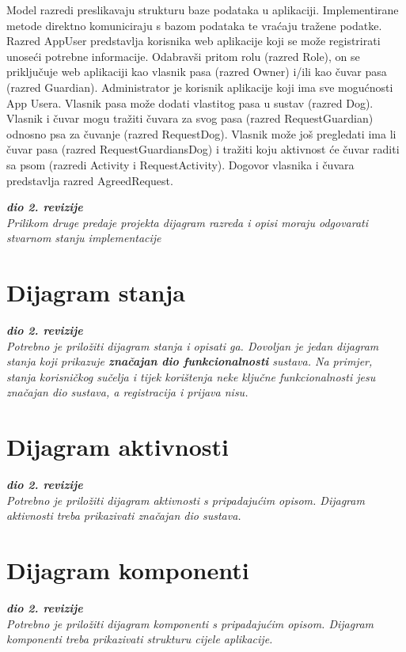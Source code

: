 			Model razredi preslikavaju strukturu baze podataka u aplikaciji. Implementirane metode direktno komuniciraju s bazom podataka te vraćaju tražene podatke.\\
			Razred AppUser predstavlja korisnika web aplikacije koji se može registrirati unoseći potrebne informacije. Odabravši pritom rolu (razred Role), on se priključuje web aplikaciji kao vlasnik pasa (razred Owner) i/ili kao čuvar pasa (razred Guardian). Administrator je korisnik aplikacije koji ima sve mogućnosti App Usera. Vlasnik pasa može dodati vlastitog pasa u sustav (razred Dog). Vlasnik i čuvar mogu tražiti čuvara za svog pasa (razred RequestGuardian) odnosno psa za čuvanje (razred RequestDog). Vlasnik može još pregledati ima li čuvar pasa (razred RequestGuardiansDog) i tražiti koju aktivnost će čuvar raditi sa psom (razredi Activity i RequestActivity). Dogovor vlasnika i čuvara predstavlja razred AgreedRequest.
			
			\eject
			
			\textbf{\textit{dio 2. revizije}}\\			
			
			\textit{Prilikom druge predaje projekta dijagram razreda i opisi moraju odgovarati stvarnom stanju implementacije}
			
			
			
			\eject
		
		\section{Dijagram stanja}
			
			
			\textbf{\textit{dio 2. revizije}}\\
			
			\textit{Potrebno je priložiti dijagram stanja i opisati ga. Dovoljan je jedan dijagram stanja koji prikazuje \textbf{značajan dio funkcionalnosti} sustava. Na primjer, stanja korisničkog sučelja i tijek korištenja neke ključne funkcionalnosti jesu značajan dio sustava, a registracija i prijava nisu. }
			
			
			\eject 
		
		\section{Dijagram aktivnosti}
			
			\textbf{\textit{dio 2. revizije}}\\
			
			 \textit{Potrebno je priložiti dijagram aktivnosti s pripadajućim opisom. Dijagram aktivnosti treba prikazivati značajan dio sustava.}
			
			\eject
		\section{Dijagram komponenti}
		
			\textbf{\textit{dio 2. revizije}}\\
		
			 \textit{Potrebno je priložiti dijagram komponenti s pripadajućim opisom. Dijagram komponenti treba prikazivati strukturu cijele aplikacije.}